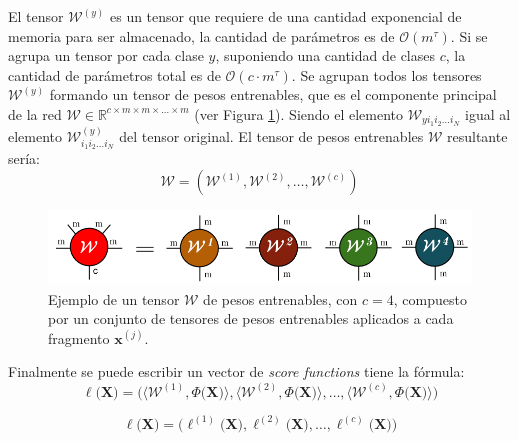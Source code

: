 \documentclass[spanish]{article}
\theoremstyle{definition}
\theoremstyle{remark}
\numberwithin{equation}{section}
\numberwithin{equation}{section} %
\begin{document}
\par 
El tensor $\mathcal{W}^{(y)}$ es un tensor que requiere de una cantidad exponencial de memoria para ser almacenado, la cantidad de parámetros es de $\mathcal{O}(m^{\tau})$. Si se agrupa un tensor por cada clase $y$, suponiendo una cantidad de clases $c$, la cantidad de parámetros total es de $\mathcal{O}(c \cdot m^{\tau})$. Se agrupan todos los tensores $\mathcal{W}^{(y)}$ formando un tensor de pesos entrenables, que es el componente principal de la red $\mathcal{W} \in \mathbb{R}^{c \times m \times m \times \ldots \times m}$ (ver Figura \ref{fig:net_tensor}). Siendo el elemento $\mathcal{W}_{yi_1i_2\ldots i_N}$ igual al elemento $\mathcal{W}^{(y)}_{i_1i_2\ldots i_N}$ del tensor original. 
El tensor de pesos entrenables $\mathcal{W}$ resultante sería: 
\begin{equation}
\label{eq_net_tensor}
\mathcal{W}= (\mathcal{W}^{(1)},\mathcal{W}^{(2)}, \ldots ,\mathcal{W}^{(c)})
\end{equation}\par
\begin{figure}[H]
 \centering
 \includegraphics[width=14cm]{img/ejemplo_tensor_red.png}
\caption[Ejemplo Tensor Red]{\footnotesize{ Ejemplo de un tensor $\mathcal{W}$ de pesos entrenables, con $c=4$, compuesto por un conjunto de tensores de pesos entrenables  aplicados a cada fragmento $\boldsymbol{x}^{(j)}$.}}
\label{fig:net_tensor}
\end{figure}\par
Finalmente se puede escribir un vector de \textit{score functions} tiene la fórmula:
\begin{equation}
\label{eq_score_functions_vector_list}
\ell\big(\boldsymbol{X}\big) = \Bigg(\Bigg\langle \mathcal{W}^{(1)} , \mathit{\Phi}\Big(\boldsymbol{X}\Big) \Bigg\rangle,\Bigg\langle \mathcal{W}^{(2)} , \mathit{\Phi}\Big(\boldsymbol{X}\Big) \Bigg\rangle,\ldots,\Bigg\langle \mathcal{W}^{(c)} , \mathit{\Phi}\Big(\boldsymbol{X}\Big) \Bigg\rangle\Bigg) 
\end{equation}\par
\begin{equation}
\label{eq_score_functions_vector}
\ell\big(\boldsymbol{X}\big) =\bigg(\ell^{(1)}\big(\boldsymbol{X}\big),\ell^{(2)}\big(\boldsymbol{X}\big), \ldots,\ell^{(c)}\big(\boldsymbol{X}\big)\bigg)
\end{equation}\par
\end{document}
